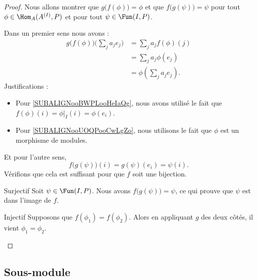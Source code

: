 \begin{proof}
    Nous allons montrer que \( g\big( f(\phi) \big)=\phi\) et que \( f\big( g(\psi) \big)=\psi\) pour tout \( \phi\in\Hom_A(A^{(I)},P)\) et pour tout \( \psi\in \Fun(I,P)\).

    Dans un premier sens nous avons :
    \begin{subequations}
        \begin{align}
            g\big( f(\phi) \big)\big( \sum_ja_je_j \big)&=\sum_ja_jf(\phi)(j)\\
            &=\sum_ja_j\phi(e_j)\label{SUBALIGNooBWPLooHeIaQg}\\
            &=\phi(\sum_ja_je_j)        \label{SUBALIGNooUOQPooCwLgZo}.
        \end{align}
    \end{subequations}
    Justifications :
    \begin{itemize}
        \item 
            Pour \eqref{SUBALIGNooBWPLooHeIaQg}, nous avons utilisé le fait que \( f(\phi)(i)=\phi|_I(i)=\phi(e_i)\).
        \item
            Pour \eqref{SUBALIGNooUOQPooCwLgZo}, nous utilisons le fait que \( \phi\) est un morphisme de modules.
    \end{itemize}
    Et pour l'autre sens,
    \begin{equation}
        f\big( g(\psi) \big)(i)=g(\psi)(e_i)=\psi(i).
    \end{equation}
    Vérifions que cela est suffisant pour que \( f\) soit une bijection.
    \begin{subproof}
    \item[Surjectif]
        Soit \( \psi\in \Fun(I,P)\). Nous avons \( f\big( g(\psi) \big)=\psi\), ce qui prouve que \( \psi\) est dans l'image de \( f\).
    \item[Injectif]
        Supposons que \( f(\phi_1)=f(\phi_2)\). Alors en appliquant \( g\) des deux côtés, il vient \( \phi_1=\phi_2\).
    \end{subproof}
\end{proof}

\subsection{Sous-module}

